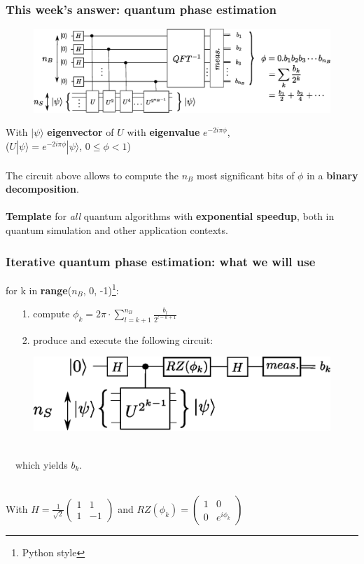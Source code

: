 \documentclass{beamer}
\begin{document}
\begin{frame}
\frametitle{This week's answer: quantum phase estimation}
\begin{center}
\begin{figure}
\includegraphics[width=\textwidth]{quantum_phase_estimation.eps}
\end{figure}
\end{center}

With $|\psi\rangle$ \textbf{eigenvector} of $U$ with \textbf{eigenvalue} $e^{-2i\pi\phi}$,\\
 ($U|\psi\rangle = e^{-2i\pi\phi}|\psi\rangle$, $0\leq\phi<1$)\\~\\
The circuit above allows to compute the $n_{B}$ most significant bits of $\phi$ in a \textbf{binary
decomposition}.\\~\\

\textbf{Template} for \emph{all} quantum algorithms with \textbf{exponential speedup}, both in quantum simulation
and other application contexts.\\
\end{frame}

\begin{frame}
\frametitle{Iterative quantum phase estimation: what we will use}

{\selectfont for k in \textbf{range}($n_{B}$, 0, -1)\footnote{Python style}:
\begin{itemize}
\item[1.] compute $\phi_{k}=2\pi\cdot\sum_{l=k+1}^{n_{B}} \frac{b_{l}}{2^{l-k+1}}$
\item[2.] produce and execute the following circuit: 
\end{itemize}
\begin{figure}
\includegraphics[width=.6\textwidth]{iterative_pea.eps}
\end{figure}~\\
$\quad$which yields $b_{k}$.\\~\\
}

With $H=\frac{1}{\sqrt{2}}\begin{pmatrix}1 & 1 \\ 1 & -1 \end{pmatrix}$ and 
$RZ(\phi_{k})=\begin{pmatrix} 1 & 0 \\ 0 & e^{i\phi_{k}}\end{pmatrix}$

\end{frame}
\end{document}
